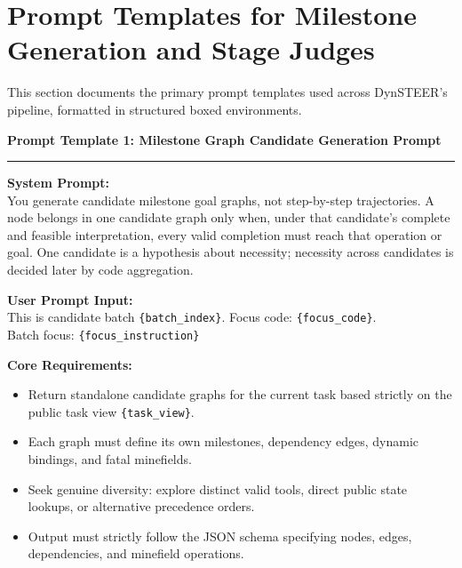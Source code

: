 \section{Prompt Templates for Milestone Generation and Stage Judges}
\label{app:prompts}

This section documents the primary prompt templates used across DynSTEER's pipeline, formatted in structured boxed environments.

\begin{tcolorbox}[colback=gray!4,colframe=black!75,arc=4pt,boxrule=0.8pt,left=8pt,right=8pt,top=6pt,bottom=6pt]
\textbf{Prompt Template 1: Milestone Graph Candidate Generation Prompt} \\[-6pt]
\rule{\textwidth}{0.4pt}
\small
\textbf{System Prompt:} \\
You generate candidate milestone goal graphs, not step-by-step trajectories. A node belongs in one candidate graph only when, under that candidate's complete and feasible interpretation, every valid completion must reach that operation or goal. One candidate is a hypothesis about necessity; necessity across candidates is decided later by code aggregation.

\textbf{User Prompt Input:} \\
This is candidate batch \texttt{\{batch\_index\}}. Focus code: \texttt{\{focus\_code\}}. \\
Batch focus: \texttt{\{focus\_instruction\}}

\textbf{Core Requirements:}
\begin{itemize}[leftmargin=*,itemsep=1pt,topsep=1pt]
  \item Return standalone candidate graphs for the current task based strictly on the public task view \texttt{\{task\_view\}}.
  \item Each graph must define its own milestones, dependency edges, dynamic bindings, and fatal minefields.
  \item Seek genuine diversity: explore distinct valid tools, direct public state lookups, or alternative precedence orders.
  \item Output must strictly follow the JSON schema specifying nodes, edges, dependencies, and minefield operations.
\end{itemize}
\end{tcolorbox}

